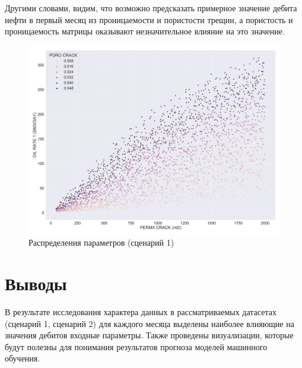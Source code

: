 Другими словами, видим, что возможно предсказать примерное значение дебита нефти в первый месяц из проницаемости и пористости трещин, а пористость и проницаемость матрицы оказывают незначительное влияние на это значение.
\begin{figure}[H] 
	\center
	\includegraphics[width=\textwidth]{images/all_data_scatterplot_1}
	\caption{Распределения параметров (сценарий 1)} 
	\label{fig:scatter-1}
\end{figure}


\section{Выводы} \label{ch1:conclusion}

В результате исследования характера данных в рассматриваемых датасетах (сценарий 1, сценарий 2) для каждого месяца выделены наиболее влияющие на значения дебитов входные параметры. Также проведены визуализации, которые будут полезны для понимания результатов прогноза моделей машинного обучения. 

